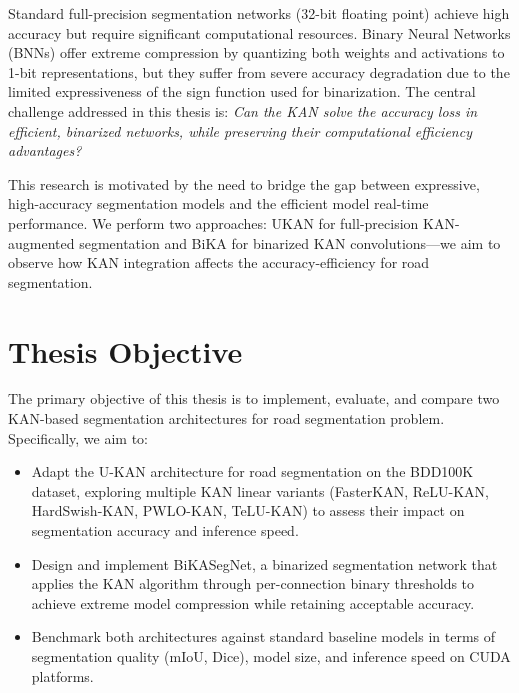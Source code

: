 \documentclass[a4paper]{report}
\begin{document}
Standard full-precision segmentation networks (32-bit floating point) achieve high accuracy but require significant computational resources. Binary Neural Networks (BNNs) offer extreme compression by quantizing both weights and activations to 1-bit representations, but they suffer from severe accuracy degradation due to the limited expressiveness of the sign function used for binarization. The central challenge addressed in this thesis is: \emph{Can the KAN solve the accuracy loss in efficient, binarized networks, while preserving their computational efficiency advantages?}

This research is motivated by the need to bridge the gap between expressive, high-accuracy segmentation models and the efficient model real-time performance. We perform two approaches: UKAN for full-precision KAN-augmented segmentation and BiKA for binarized KAN convolutions—we aim to observe how KAN integration affects the accuracy-efficiency for road segmentation. 


\section{Thesis Objective} 
\label{sec: obj}
The primary objective of this thesis is to implement, evaluate, and compare two KAN-based segmentation architectures for road segmentation problem. Specifically, we aim to: 

\begin{itemize}
    \item Adapt the U-KAN architecture for road segmentation on the BDD100K dataset, exploring multiple KAN linear variants (FasterKAN, ReLU-KAN, HardSwish-KAN, PWLO-KAN, TeLU-KAN) to assess their impact on segmentation accuracy and inference speed.
    \item Design and implement BiKASegNet, a binarized segmentation network that applies the KAN algorithm through per-connection binary thresholds to achieve extreme model compression while retaining acceptable accuracy.
    \item Benchmark both architectures against standard baseline models in terms of segmentation quality (mIoU, Dice), model size, and inference speed on CUDA platforms.
      
\end{itemize}
      
\end{document}
